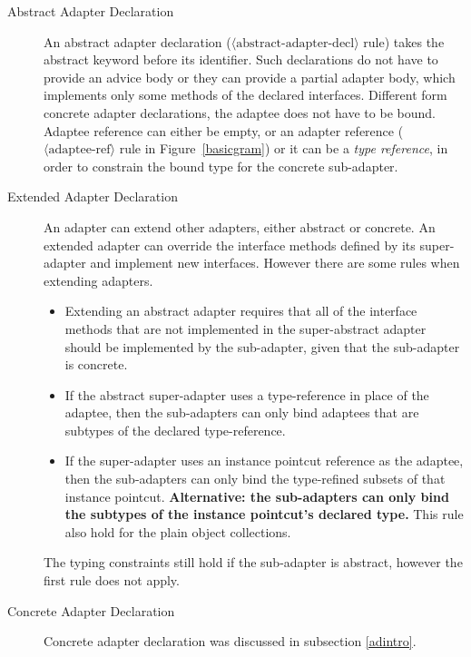 \documentclass{acm_proc_article-sp}
\begin{document}
\begin{description}
	\item[Abstract Adapter Declaration] An abstract adapter declaration ($\langle \text{abstract-adapter-decl}\rangle$ rule) takes the \textsf{abstract} keyword before its identifier. Such declarations do not have to provide an advice body or they can provide a partial adapter body, which implements only some methods of the declared interfaces. Different form concrete adapter declarations, the adaptee does not have to be bound. Adaptee reference can either be empty, or an adapter reference ($\langle \text{adaptee-ref}\rangle$ rule in Figure~\ref{basicgram}) or it can be a \emph{type reference}, in order to constrain the bound type for the concrete sub-adapter.
	\item[Extended Adapter Declaration] An adapter can extend other adapters, either abstract or concrete. An extended adapter can override the interface methods defined by its super-adapter and implement new interfaces. However there are some rules when extending adapters. 
	\begin{itemize}
		\item Extending an abstract adapter requires that all of the interface methods that are not implemented in the super-abstract adapter should be implemented by the sub-adapter, given that the sub-adapter is concrete. 
		\item If the abstract super-adapter uses a type-reference in place of the adaptee, then the sub-adapters can only bind adaptees that are subtypes of the declared type-reference.
		\item If the super-adapter uses an instance pointcut reference as the adaptee, then the sub-adapters can only bind the type-refined subsets of that instance pointcut. \textbf{Alternative: the sub-adapters can only bind the subtypes of the instance pointcut's declared type.} This rule also hold for the plain object collections.
	\end{itemize}
	The typing constraints still hold if the sub-adapter is abstract, however the first rule does not apply.
	\item[Concrete Adapter Declaration] Concrete adapter declaration was discussed in subsection \ref{adintro}.
\end{description}
 
\end{document}
